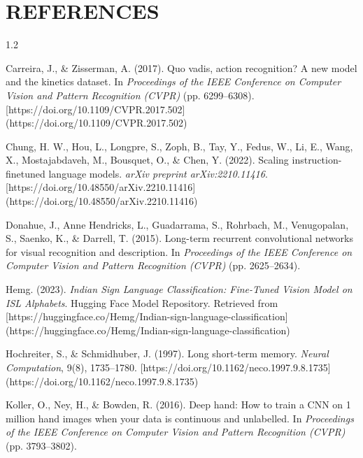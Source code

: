 \documentclass[12pt,a4paper]{report}
\begin{document}
\chapter*{REFERENCES} \label{chap:refs}
\thispagestyle{plain}
\begin{spacing}{1.2}
\begin{enumerate}[label={[\arabic*]}, leftmargin=2.5em, itemsep=2pt]
\item Carreira, J., \& Zisserman, A. (2017). Quo vadis, action recognition? A new model and the kinetics dataset. In \textit{Proceedings of the IEEE Conference on Computer Vision and Pattern Recognition (CVPR)} (pp. 6299--6308). [https://doi.org/10.1109/CVPR.2017.502](https://doi.org/10.1109/CVPR.2017.502)

\item Chung, H. W., Hou, L., Longpre, S., Zoph, B., Tay, Y., Fedus, W., Li, E., Wang, X., Mostajabdaveh, M., Bousquet, O., \& Chen, Y. (2022). Scaling instruction-finetuned language models. \textit{arXiv preprint arXiv:2210.11416}. [https://doi.org/10.48550/arXiv.2210.11416](https://doi.org/10.48550/arXiv.2210.11416)

\item Donahue, J., Anne Hendricks, L., Guadarrama, S., Rohrbach, M., Venugopalan, S., Saenko, K., \& Darrell, T. (2015). Long-term recurrent convolutional networks for visual recognition and description. In \textit{Proceedings of the IEEE Conference on Computer Vision and Pattern Recognition (CVPR)} (pp. 2625--2634).

\item Hemg. (2023). \textit{Indian Sign Language Classification: Fine-Tuned Vision Model on ISL Alphabets}. Hugging Face Model Repository. Retrieved from [https://huggingface.co/Hemg/Indian-sign-language-classification](https://huggingface.co/Hemg/Indian-sign-language-classification)

\item Hochreiter, S., \& Schmidhuber, J. (1997). Long short-term memory. \textit{Neural Computation}, 9(8), 1735--1780. [https://doi.org/10.1162/neco.1997.9.8.1735](https://doi.org/10.1162/neco.1997.9.8.1735)

\item Koller, O., Ney, H., \& Bowden, R. (2016). Deep hand: How to train a CNN on 1 million hand images when your data is continuous and unlabelled. In \textit{Proceedings of the IEEE Conference on Computer Vision and Pattern Recognition (CVPR)} (pp. 3793--3802).


\end{enumerate}
\end{spacing}
\end{document}
